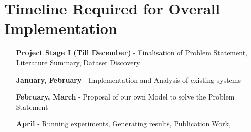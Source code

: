 \chapter{Timeline Required for Overall Implementation}

\begin{itemize}[align=left]

\item [\textbf{Project Stage I (Till December)}] - Finalisation of Problem
Statement, Literature Summary, Dataset Discovery

\item [\textbf{January, February}] - Implementation and Analysis of existing
systems

\item [\textbf{February, March}] - Proposal of our own Model to solve the
Problem Statement

\item [\textbf{April}] - Running experiments, Generating results, Publication
Work, 

\end{itemize}
